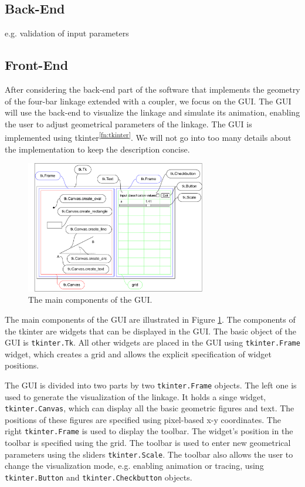 \documentclass{article}
\begin{document}
\subsection{Back-End}
e.g. validation of input parameters

\subsection{Front-End}

After considering the back-end part of the software that implements the geometry of the four-bar linkage extended with a coupler, we focus on the GUI. The GUI will use the back-end to visualize the linkage and simulate its animation, enabling the user to adjust geometrical parameters of the linkage. The GUI is implemented using tkinter\textsuperscript{\ref{fn:tkinter}}. We will not go into too many details about the implementation to keep the description concise.

\begin{figure}[h]
	\begin{center}
		\includegraphics[width=0.7\textwidth]{./figures/tkinter_grid.pdf}
	\end{center}
	\caption{The main components of the GUI.}
	\label{fig:tkinter_parts}
\end{figure}

The main components of the GUI are illustrated in Figure \ref{fig:tkinter_parts}. The components of the tkinter are widgets that can be displayed in the GUI. The basic object of the GUI is \texttt{tkinter.Tk}. All other widgets are placed in the GUI using \texttt{tkinter.Frame} widget, which creates a grid and allows the explicit specification of widget positions.

The GUI is divided into two parts by two \texttt{tkinter.Frame} objects. The left one is used to generate the visualization of the linkage. It holds a singe widget, \texttt{tkinter.Canvas}, which can display all the basic geometric figures and text. The positions of these figures are specified using pixel-based x-y coordinates. The right \texttt{tkinter.Frame} is used to display the toolbar. The widget's position in the toolbar is specified using the grid. The toolbar is used to enter new geometrical parameters using the sliders \texttt{tkinter.Scale}. The toolbar also allows the user to change the visualization mode, e.g. enabling animation or tracing, using \texttt{tkinter.Button} and \texttt{tkinter.Checkbutton} objects.
\end{document}
